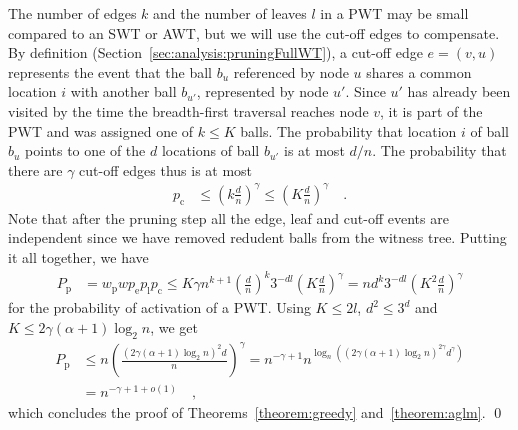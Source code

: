 \documentclass[a4paper,12pt]{article}
\begin{document}
The number of edges $k$ and the number of leaves $l$ in a PWT may be small compared to an SWT or AWT, but we will use the cut-off edges to compensate. By definition (Section~\ref{sec:analysis:pruningFullWT}), a cut-off edge $e=(v, u)$ represents the event that the ball $b_u$ referenced by node $u$ shares a common location $i$ with another ball $b_{u'}$, represented by node $u'$. Since $u'$ has already been visited by the time the breadth-first traversal reaches node $v$, it is part of the PWT and was assigned one of $k\leq K$ balls. The probability that location $i$ of ball $b_u$ points to one of the $d$ locations of ball $b_{u'}$ is at most $d/n$. The probability that there are $\gamma$ cut-off edges thus is at most 
\begin{align*}
p_\mathrm{c} &\leq \left(k \frac{d}{n}\right)^\gamma 
    \leq \left(K \frac{d}{n}\right)^\gamma \quad .
\end{align*}
Note that after the pruning step all the edge, leaf and cut-off events are independent since we have removed redudent balls from the witness tree. Putting it all together, we have
\begin{align*}
P_\mathrm{p} &= w_\mathrm{p} w  p_\mathrm{e}  p_\mathrm{l}  p_\mathrm{c} 
		\leq K\gamma n^{k+1} \left(\frac{d}{n}\right)^k3^{-d l}  \left(K \frac{d}{n}\right)^\gamma
		= n  d^k 3^{-d l}  \left(K^2 \frac{d}{n} \right)^\gamma 
\end{align*}
for the probability of activation of a PWT. Using $K \leq 2l$, $d^2 \leq 3^d$ and $K \leq 2\gamma  \left( \alpha +1 \right)  \log_2 n$, we get
\begin{align*}
P_\mathrm{p} &\leq n \left(\frac{\left(2\gamma  \left(\alpha +1 \right)  \log_2 n\right)^2 d}{n}\right)^\gamma 
        = n^{-\gamma +1}  n ^{\log_n\left( \left(2\gamma \left(\alpha+1\right) \log_2n \right)^{2\gamma}  d^\gamma \right)} \\
        &= n^{-\gamma+1+o\left(1\right)} \quad ,
\end{align*}
which concludes the proof of Theorems~\ref{theorem:greedy} and~\ref{theorem:aglm}.
\qed
 
\end{document}
